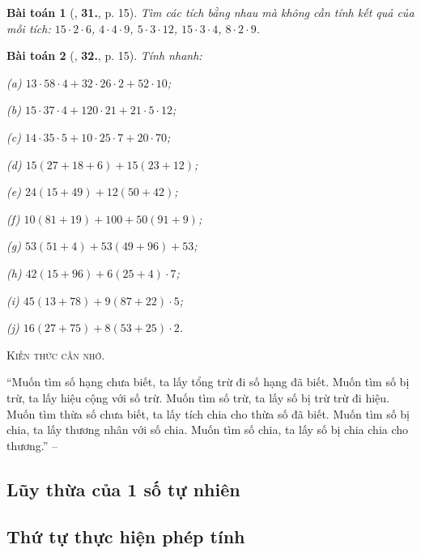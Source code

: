 \documentclass{article}
\numberwithin{equation}{section}
\newtheorem{baitoan}{Bài toán}[section]
\begin{document}
\begin{baitoan}[\cite{Trong_Toan_6_2021}, \textbf{31.}, p. 15]
	Tìm các tích bằng nhau mà không cần tính kết quả của mỗi tích: $15\cdot 2\cdot 6$, $4\cdot 4\cdot 9$, $5\cdot 3\cdot 12$, $15\cdot 3\cdot 4$, $8\cdot 2\cdot 9$.
\end{baitoan}

\begin{baitoan}[\cite{Trong_Toan_6_2021}, \textbf{32.}, p. 15]
	Tính nhanh:
	\begin{enumerate*}
		\item[(a)] $13\cdot 58\cdot 4 + 32\cdot 26\cdot 2 + 52\cdot 10$;
		\item[(b)] $15\cdot 37\cdot 4 + 120\cdot 21 + 21\cdot 5\cdot 12$;
		\item[(c)] $14\cdot 35\cdot 5 + 10\cdot 25\cdot 7 + 20\cdot 70$;
		\item[(d)] $15(27 + 18 + 6) + 15(23 + 12)$;
		\item[(e)] $24(15 + 49) + 12(50 + 42)$;
		\item[(f)] $10(81 + 19) + 100 + 50(91 + 9)$;
		\item[(g)] $53(51 + 4) + 53(49 + 96) + 53$;
		\item[(h)] $42(15 + 96) + 6(25 + 4)\cdot 7$;
		\item[(i)] $45(13 + 78) + 9(87 + 22)\cdot 5$;
		\item[(j)] $16(27 + 75) + 8(53 + 25)\cdot 2$.
	\end{enumerate*}
\end{baitoan}
\noindent\textsc{Kiến thức cần nhớ.}
\begin{tcolorbox}
	``Muốn tìm số hạng chưa biết, ta lấy tổng trừ đi số hạng đã biết. Muốn tìm số bị trừ, ta lấy hiệu cộng với số trừ. Muốn tìm số trừ, ta lấy số bị trừ trừ đi hiệu. Muốn tìm thừa số chưa biết, ta lấy tích chia cho thừa số đã biết. Muốn tìm số bị chia, ta lấy thương nhân với số chia. Muốn tìm số chia, ta lấy số bị chia chia cho thương.'' -- \cite[p. 16]{Trong_Toan_6_2021}
	
	
\end{tcolorbox}

\subsection{Lũy thừa của 1 số tự nhiên}

\subsection{Thứ tự thực hiện phép tính}
\end{document}
